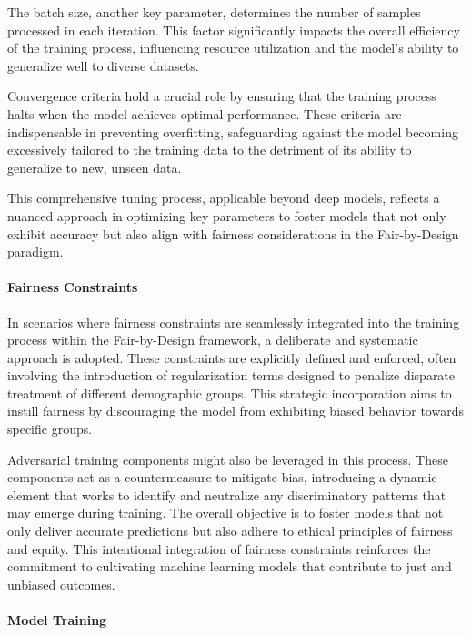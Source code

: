 The batch size, another key parameter, determines the number of samples processed in each iteration. This factor significantly impacts the overall efficiency of the training process, influencing resource utilization and the model's ability to generalize well to diverse datasets.

Convergence criteria hold a crucial role by ensuring that the training process halts when the model achieves optimal performance. These criteria are indispensable in preventing overfitting, safeguarding against the model becoming excessively tailored to the training data to the detriment of its ability to generalize to new, unseen data.

This comprehensive tuning process, applicable beyond deep models, reflects a nuanced approach in optimizing key parameters to foster models that not only exhibit accuracy but also align with fairness considerations in the Fair-by-Design paradigm.

\paragraph{Fairness Constraints}

In scenarios where fairness constraints are seamlessly integrated into the training process within the Fair-by-Design framework, a deliberate and systematic approach is adopted. These constraints are explicitly defined and enforced, often involving the introduction of regularization terms designed to penalize disparate treatment of different demographic groups. This strategic incorporation aims to instill fairness by discouraging the model from exhibiting biased behavior towards specific groups.

Adversarial training components might also be leveraged in this process. These components act as a countermeasure to mitigate bias, introducing a dynamic element that works to identify and neutralize any discriminatory patterns that may emerge during training. The overall objective is to foster models that not only deliver accurate predictions but also adhere to ethical principles of fairness and equity. This intentional integration of fairness constraints reinforces the commitment to cultivating machine learning models that contribute to just and unbiased outcomes.

\paragraph{Model Training}

